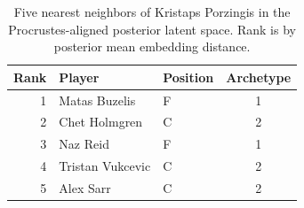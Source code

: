 \begin{table}[htbp]
  \centering\small
  \begin{tabular}{rllc}
    \toprule
    Rank & Player & Position & Archetype \\
    \midrule
    1 & Matas Buzelis & F & 1 \\
    2 & Chet Holmgren & C & 2 \\
    3 & Naz Reid & F & 1 \\
    4 & Tristan Vukcevic & C & 2 \\
    5 & Alex Sarr & C & 2 \\
    \bottomrule
  \end{tabular}
  \caption{Five nearest neighbors of Kristaps Porzingis in the Procrustes-aligned posterior latent space. Rank is by posterior mean embedding distance.}
  \label{tab:Kristaps_Porzingis_neighbors}
\end{table}

